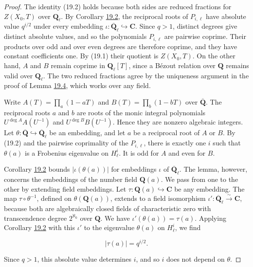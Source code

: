 \documentclass[11pt]{article}
\begin{document}
\begin{proof}[{Proof}]\label{bp23}%
The identity (19.2) holds because both sides are reduced fractions for \(Z(X_0,T)\) over \(\mathbf Q_\ell\). By Corollary \hyperref[bp8]{19.2}, the reciprocal roots of \(P_{i,\ell}\) have absolute value \(q^{i/2}\) under every embedding \(\iota:\overline{\mathbf Q}_\ell\hookrightarrow\mathbf C\). Since \(q>1\), distinct degrees give distinct absolute values, and so the polynomials \(P_{i,\ell}\) are pairwise coprime. Their products over odd and over even degrees are therefore coprime, and they have constant coefficients one. By (19.1) their quotient is \(Z(X_0,T)\). On the other hand, \(A\) and \(B\) remain coprime in \(\mathbf Q_\ell[T]\), since a Bézout relation over \(\mathbf Q\) remains valid over \(\mathbf Q_\ell\). The two reduced fractions agree by the uniqueness argument in the proof of Lemma \hyperref[bp15]{19.4}, which works over any field.

Write \(A(T)=\prod_a(1-aT)\) and \(B(T)=\prod_b(1-bT)\) over \(\overline{\mathbf Q}\). The reciprocal roots \(a\) and \(b\) are roots of the monic integral polynomials \(U^{\deg A}A(U^{-1})\) and \(U^{\deg B}B(U^{-1})\). Hence they are nonzero algebraic integers. Let \(\theta:\overline{\mathbf Q}\hookrightarrow\overline{\mathbf Q}_\ell\) be an embedding, and let \(a\) be a reciprocal root of \(A\) or \(B\). By (19.2) and the pairwise coprimality of the \(P_{i,\ell}\), there is exactly one \(i\) such that \(\theta(a)\) is a Frobenius eigenvalue on \(H^i_\ell\). It is odd for \(A\) and even for \(B\).

Corollary \hyperref[bp8]{19.2} bounds \(|\iota(\theta(a))|\) for embeddings \(\iota\) of \(\overline{\mathbf Q}_\ell\). The lemma, however, concerns the embeddings of the number field \(\mathbf Q(a)\). We pass from one to the other by extending field embeddings. Let \(\tau:\mathbf Q(a)\hookrightarrow\mathbf C\) be any embedding. The map \(\tau\circ\theta^{-1}\), defined on \(\theta(\mathbf Q(a))\), extends to a field isomorphism \(\iota':\overline{\mathbf Q}_\ell\xrightarrow{\sim}\mathbf C\), because both are algebraically closed fields of characteristic zero with transcendence degree \(2^{\aleph_0}\) over \(\mathbf Q\). We have \(\iota'(\theta(a))=\tau(a)\). Applying Corollary \hyperref[bp8]{19.2} with this \(\iota'\) to the eigenvalue \(\theta(a)\) on \(H^i_\ell\), we find

\[
|\tau(a)|=q^{i/2}.
\]

Since \(q>1\), this absolute value determines \(i\), and so \(i\) does not depend on \(\theta\).
\end{proof}
\end{document}

